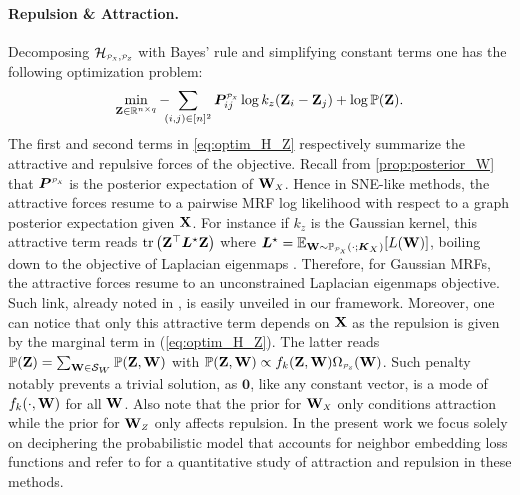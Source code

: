 \paragraph{Repulsion \& Attraction.}
Decomposing $\mathcal{H}_{\scaleto{\mathcal{P}_X}{4pt}, \scaleto{\mathcal{P}_Z}{4pt}}$ with Bayes' rule and simplifying constant terms one has the following optimization problem: 
\begin{align}\label{eq:optim_H_Z}
    \min_{\Z \in \mathbb{R}^{n \times q}} -\hspace{-0.2cm}\sum_{(i,j) \in [n]^2} \bm{P}^{\scaleto{\mathcal{P}_X}{4pt}}_{ij}\log k_z(\Z_i - \Z_j) + \log \mathbb{P}(\Z).
\end{align}
The first and second terms in \cref{eq:optim_H_Z} respectively summarize the attractive and repulsive forces of the objective. Recall from \cref{prop:posterior_W}
that $\bm{P}^{\scaleto{\mathcal{P}_X}{4pt}}$ is the posterior expectation of $\W_{\scaleto{X}{4pt}}$. Hence in SNE-like methods, the attractive forces resume to a pairwise MRF log likelihood with respect to a graph posterior expectation given $\mathbf{X}$. For instance if $k_z$ is the Gaussian kernel, this attractive term reads $\operatorname{tr} \left(\mathbf{Z}^\top \bm{L}^\star \mathbf{Z} \right)$ where $\bm{L}^\star = \mathbb{E}_{\W \sim \mathbb{P}_{\scaleto{\mathcal{P}_X}{4pt}}(\cdot;\bm{K}_{\scaleto{X}{4pt}})}[L(\W)]$, boiling down to the objective of Laplacian eigenmaps \cite{belkin2003laplacian}. Therefore, for Gaussian MRFs, the attractive forces resume to an unconstrained Laplacian eigenmaps objective. Such link, already noted in \cite{carreira2010elastic}, is easily unveiled in our framework. Moreover, one can notice that only this attractive term depends on $\mathbf{X}$ as the repulsion is given by the marginal term in (\ref{eq:optim_H_Z}). The latter reads $\mathbb{P}(\Z) = \sum_{\W \in \mathcal{S}_{\scaleto{W}{4pt}}} \mathbb{P}(\Z, \W)$ with $\mathbb{P}(\Z, \W) \propto f_k(\Z, \W)\Omega_{\scaleto{\mathcal{P}_Z}{4pt}}(\W)$. Such penalty notably prevents a trivial solution, as $\bm{0}$, like any constant vector, is a mode of $f_k(\cdot, \mathbf{W})$ for all $\mathbf{W}$. Also note that the prior for $\W_{\scaleto{X}{4pt}}$ only conditions attraction while the prior for $\W_{\scaleto{Z}{4pt}}$ only affects repulsion. In the present work we focus solely on deciphering the probabilistic model that accounts for neighbor embedding loss functions and refer to \cite{bohm2020unifying} for a quantitative study of attraction and repulsion in these methods.

